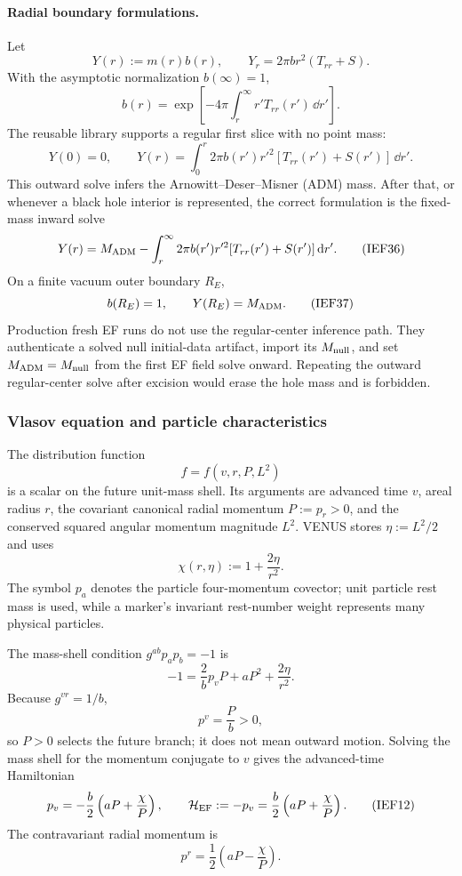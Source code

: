 \paragraph{Radial boundary formulations.}
Let
\[
 Y(r):=m(r)b(r),\qquad
 Y_r=2\pi b r^2(T_{rr}+S).                               \tag{IEF33}
\]
With the asymptotic normalization \(b(\infty)=1\),
\[
 b(r)=\exp\left[-4\pi\int_r^\infty r'T_{rr}(r')\,\dd r'\right]. \tag{IEF34}
\]
The reusable library supports a regular first slice with no point mass:
\[
 Y(0)=0,\qquad
 Y(r)=\int_0^r2\pi b(r')r'^2[T_{rr}(r')+S(r')]\,\dd r'. \tag{IEF35}
\]
This outward solve infers the Arnowitt--Deser--Misner (ADM) mass.  After that,
or whenever a black hole interior is represented, the correct formulation is
the fixed-mass inward solve
\[
 Y(r)=M_{\rm ADM}
 -\int_r^\infty2\pi b(r')r'^2[T_{rr}(r')+S(r')]\,\mathrm d r'. \tag{IEF36}
\]
On a finite vacuum outer boundary \(R_E\),
\[
 b(R_E)=1,\qquad Y(R_E)=M_{\rm ADM}.                      \tag{IEF37}
\]
Production fresh EF runs do not use the regular-center inference path.  They
authenticate a solved null initial-data artifact, import its
\(M_{\rm null}\), and set \(M_{\rm ADM}=M_{\rm null}\) from the first EF field
solve onward.  Repeating the outward regular-center solve after excision would
erase the hole mass and is forbidden.

\subsubsection{Vlasov equation and particle characteristics}
\label{sec:ef-vlasov-derivation}

The distribution function
\[
                 f=f(v,r,P,L^2)
\]
is a scalar on the future unit-mass shell.  Its arguments are advanced time
\(v\), areal radius \(r\), the covariant canonical radial momentum
\(P:=p_r>0\), and the conserved squared angular momentum magnitude \(L^2\).
VENUS stores \(\eta:=L^2/2\) and uses
\[
 \chi(r,\eta):=1+\frac{2\eta}{r^2}.                       \tag{IEF9}
\]
The symbol \(p_a\) denotes the particle four-momentum covector; unit particle
rest mass is used, while a marker's invariant rest-number weight represents
many physical particles.

The mass-shell condition \(g^{ab}p_a p_b=-1\) is
\[
 -1=\frac{2}{b}p_v P+aP^2+\frac{2\eta}{r^2}.             \tag{IEF11}
\]
Because \(g^{vr}=1/b\),
\[
 p^v=\frac{P}{b}>0,                                      \tag{IEF10}
\]
so \(P>0\) selects the future branch; it does not mean outward motion.  Solving
the mass shell for the momentum conjugate to \(v\) gives the advanced-time
Hamiltonian
\[
 p_v=-\frac b2\left(aP+\frac{\chi}{P}\right),\qquad
 {\cal H}_{\rm EF}:=-p_v
 =\frac b2\left(aP+\frac{\chi}{P}\right).                \tag{IEF12}
\]
The contravariant radial momentum is
\[
 p^r=\frac12\left(aP-\frac{\chi}{P}\right).               \tag{IEF13}
\]

